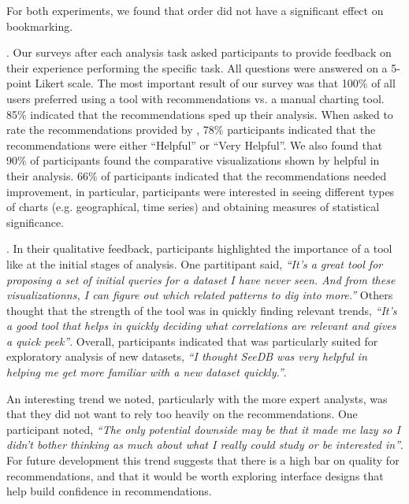  For both experiments, we found that order did not have a significant effect on bookmarking.

. 
Our surveys after each analysis task asked participants to provide feedback on their experience
performing the specific task.
All questions were answered on a 5-point Likert scale.
The most important result of our survey was that 100\% of all users preferred using a tool with 
recommendations vs. a manual charting tool.
85\% indicated that the recommendations sped up their analysis.
When asked to rate the recommendations provided by \SeeDB, 78\% participants indicated that the
recommendations were either ``Helpful'' or ``Very Helpful''. 
We also found that 90\% of participants found the comparative visualizations shown by \SeeDB 
helpful in their analysis.
66\% of participants indicated that the recommendations needed improvement, in particular,
participants were interested in seeing different types of charts (e.g. geographical, time series)
and obtaining measures of statistical significance.

. In their qualitative feedback, participants highlighted the importance of 
a tool like \SeeDB at the initial stages of analysis. 
One partitipant said, {\em ``It's a great tool for proposing a set of initial queries for a dataset I have never seen. 
And from these visualizationns, I can figure out which related patterns to dig into more.''}
Others thought that the strength of the tool was in quickly finding relevant trends, {\em ``It's a good tool that helps 
in quickly deciding what correlations are relevant and gives a quick peek''}. 
Overall, participants indicated that \SeeDB was particularly suited for exploratory analysis of new datasets, 
{\em ``I thought SeeDB was very helpful in helping me get more familiar with a new dataset quickly.''}.

An interesting trend we noted, particularly with the more expert analysts, was that they did not want
to rely too heavily on the recommendations.
One participant noted, {\em ``The only potential downside may be that it made me lazy so I didn't bother thinking 
as much about what I really could study or be interested in''}.
For future development this trend suggests that there is a high bar on quality for recommendations, and that
it would be worth exploring interface designs that help build confidence in recommendations.





